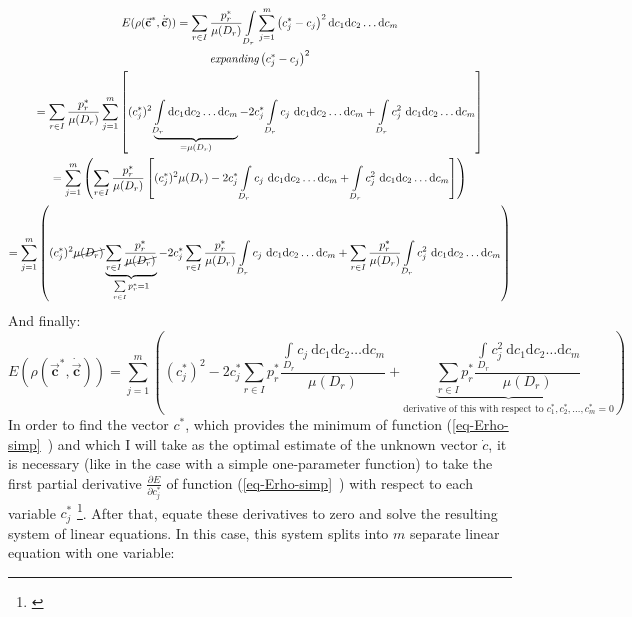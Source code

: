 \documentclass[11pt,a4paper]{article}
\numberwithin{equation}{subsection}
\newcommand{\vecc}{\vec{\textbf{c}}}
\begin{document}
\begin{gather}
\nonumber
E(\rho(\vecc^{*},\dot{\vecc}))=\sum\limits_{r \in I} \frac{p_{r}^{*}}{\mu(D_{r})} \int\limits_{D_{r}}\sum\limits_{j=1}^{m} \left( c_{j}^{*}-c_{j} \right)^{2}\mathrm{d}c_{1}\mathrm{d}c_{2}\dots \mathrm{d}c_{m}\\
\nonumber
\textit{expanding} \left( c_{j}^{*}-c_{j} \right)^{2} \\
\nonumber
=\sum\limits_{r \in I} \frac{p_{r}^{*}}{\mu(D_{r})} \sum\limits_{j=1}^{m} \left[ (c_{j}^{*})^{2} \underbrace{\int\limits_{D_{r}} \mathrm{d}c_{1}\mathrm{d}c_{2}\dots \mathrm{d}c_{m}}_{{=\mu(D_{r})}} - 2c_{j}^{*} \int\limits_{D_{r}} c_{j} \  \mathrm{d}c_{1}\mathrm{d}c_{2}\dots \mathrm{d}c_{m} + \int\limits_{D_{r}} c_{j}^{2} \  \mathrm{d}c_{1}\mathrm{d}c_{2}\dots \mathrm{d}c_{m}\right]\\
\nonumber
=\sum\limits_{j=1}^{m} \left( \sum\limits_{r \in I} \frac{p_{r}^{*}}{\mu(D_{r})} \left[ (c_{j}^{*})^{2} \mu(D_{r})-2c_{j}^{*} \int\limits_{D_{r}} c_{j} \  \mathrm{d}c_{1}\mathrm{d}c_{2}\dots \mathrm{d}c_{m} + \int\limits_{D_{r}} c_{j}^{2} \  \mathrm{d}c_{1}\mathrm{d}c_{2}\dots \mathrm{d}c_{m} \right] \right)\\ 
=\sum\limits_{j=1}^{m} \left( (c_{j}^{*})^{2} \cancel{\mu(D_{r})} \underbrace{\sum\limits_{r \in I} \frac{p_{r}^{*}}{\cancel{\mu(D_{r})}}}_{\sum\limits_{r \in I}p_{r}^{*} = 1} - 2c_{j}^{*} \sum\limits_{r \in I}\frac{p_{r}^{*}}{\mu(D_{r})} \int\limits_{D_{r}} c_{j} \  \mathrm{d}c_{1}\mathrm{d}c_{2}\dots \mathrm{d}c_{m} + \sum\limits_{r \in I}\frac{p_{r}^{*}}{\mu(D_{r})} \int\limits_{D_{r}} c_{j}^{2} \  \mathrm{d}c_{1}\mathrm{d}c_{2}\dots \mathrm{d}c_{m} \right)
\end{gather}
And finally:
\begin{equation}
E(\rho(\vecc^{*},\dot{\vecc}))= \sum\limits_{j=1}^{m} \left( (c_{j}^{*})^{2} - 2c_{j}^{*} \sum\limits_{r \in I} p_{r}^{*} \frac{\int\limits_{D_{r}} c_{j} \  \mathrm{d}c_{1}\mathrm{d}c_{2}\dots \mathrm{d}c_{m}}{\mu(D_{r})} + \underbrace{\sum\limits_{r \in I} p_{r}^{*} \frac{\int\limits_{D_{r}} c_{j}^{2} \  \mathrm{d}c_{1}\mathrm{d}c_{2}\dots \mathrm{d}c_{m}}{\mu(D_{r})}}_{\text{derivative of this with respect to } c_{1}^{*}, c_{2}^{*},\dots,c_{m}^{*} = 0} \right) \label{eq-Erho-simp}
\end{equation}
In order to find the vector $c^{*}$, which provides the minimum of function (\vref{eq-Erho-simp}~) and which I will take as the optimal estimate of the unknown vector $\dot{c}$, it is necessary (like in the case with a simple one-parameter function) to take the first partial derivative $\frac{\partial E}{\partial c_{j}^{*}}$ of function (\vref{eq-Erho-simp}~) with respect to each variable $c_{j}^{*}$ \footnote{\cite{stewart_2008_deriv}}. After that, equate these derivatives to zero and solve the resulting system of linear equations. In this case, this system splits into $m$ separate linear equation with one variable:
\end{document}
